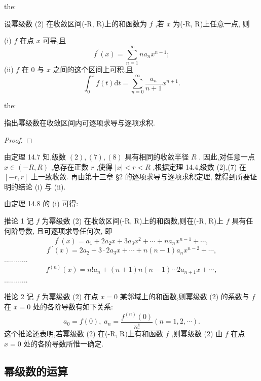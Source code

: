 \begin{theorem}{}{the:}

\end{theorem}
 设幂级数 (2) 在收敛区间(-R, R)上的和函数为 \(f\) ,若 \(x\) 为(-R, R)上任意一点, 则

(i) \(f\) 在点 \(x\) 可导,且
\[
{f}^{\prime }\left( x\right)  = \mathop{\sum }\limits_{{n = 1}}^{\infty }n{a}_{n}{x}^{n - 1};
\]
(ii) \(f\) 在 0 与 \(x\) 之间的这个区间上可积,且
\[
{\int }_{0}^{x}f\left( t\right) \mathrm{d}t = \mathop{\sum }\limits_{{n = 0}}^{\infty }\frac{{a}_{n}}{n + 1}{x}^{n + 1}.
\]
\begin{theorem}{}{the:}

\end{theorem}
 指出幂级数在收敛区间内可逐项求导与逐项求积.

\begin{proof}

\end{proof}
由定理 14.7 知,级数 \(\left( 2\right) ,\left( 7\right) ,\left( 8\right)\) 具有相同的收敛半径 \(R\) . 因此,对任意一点 \(x \in  \left( {-R,R}\right)\) ,总存在正数 \(r\) ,使得 \(\left| x\right|  < r < R\) ,根据定理 14.4,级数 (2),(7) 在 \(\left\lbrack  {-r,r}\right\rbrack\) 上一致收敛. 再由第十三章 §2 的逐项求导与逐项求积定理, 就得到所要证明的结论 (i) 与 (ii).

由定理 14.8 的 (i) 可得:

推论 1 记 \(f\) 为幂级数 (2) 在收敛区间(-R, R)上的和函数,则在(-R, R)上 \(f\) 具有任何阶导数, 且可逐项求导任何次, 即
\[
{f}^{\prime }\left( x\right)  = {a}_{1} + 2{a}_{2}x + 3{a}_{3}{x}^{2} + \cdots  + n{a}_{n}{x}^{n - 1} + \cdots ,
\]
\[
{f}^{\prime \prime }\left( x\right)  = 2{a}_{2} + 3 \cdot  2{a}_{3}x + \cdots  + n\left( {n - 1}\right) {a}_{n}{x}^{n - 2} + \cdots ,
\]
............
\[
{f}^{\left( n\right) }\left( x\right)  = n!{a}_{n} + \left( {n + 1}\right) n\left( {n - 1}\right) \cdots 2{a}_{n + 1}x + \cdots ,
\]
............

推论 2 记 \(f\) 为幂级数 (2) 在点 \(x = 0\) 某邻域上的和函数,则幂级数 (2) 的系数与 \(f\) 在 \(x = 0\) 处的各阶导数有如下关系:
\[
{a}_{0} = f\left( 0\right) ,\;{a}_{n} = \frac{{f}^{\left( n\right) }\left( 0\right) }{n!}\left( {n = 1,2,\cdots }\right) .
\]
这个推论还表明,若幂级数 (2) 在(-R, R)上有和函数 \(f\) ,则幂级数 (2) 由 \(f\) 在点 \(x = 0\) 处的各阶导数所惟一确定.

\subsection{幂级数的运算}

